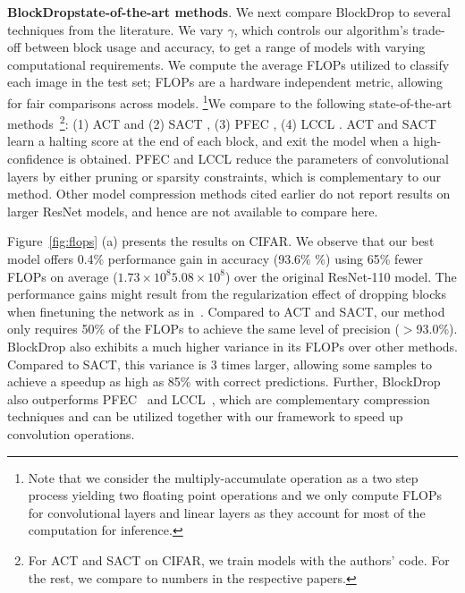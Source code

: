 \documentclass[10pt,twocolumn,letterpaper]{article}
\newcommand{\system}{BlockDrop\xspace}
\begin{document}
\vspace{0.05in}\noindent\textbf{\system \vs state-of-the-art methods}. We next compare \system to several techniques from the literature. %
We vary $\gamma$, which controls our algorithm's trade-off between block usage and accuracy, to get a range of models with varying computational requirements. %
We compute the average FLOPs utilized to classify each image in the test set; FLOPs are a hardware independent metric, allowing for fair comparisons across models. 
\footnote{Note that we consider the multiply-accumulate operation as a two step process yielding two floating point operations and we only compute FLOPs for convolutional layers and linear layers as they account for most of the computation for inference.}We compare to the following state-of-the-art methods~\footnote{For ACT and SACT on CIFAR, we train models with the authors' code. For the rest, we compare to numbers in the respective papers.}: (1) ACT and (2) SACT \cite{figurnov2017spatially}, (3) PFEC \cite{li2016pruning}, (4) LCCL \cite{dong2017more}.  ACT and SACT learn a halting score at the end of each block, and exit the model when a high-confidence is obtained.
PFEC and LCCL reduce the parameters of convolutional layers by either pruning or sparsity constraints, which is complementary to our method. Other model compression methods cited earlier do not report results on larger ResNet models, and hence are not available to compare here.

Figure~\ref{fig:flops} (a) presents the results on CIFAR. We observe that our best model offers 0.4\% performance gain in accuracy (93.6\% \%) using 65\% fewer FLOPs on average ($1.73\times10^{8}$\vs$5.08\times10^{8}$) over the original ResNet-110 model. The performance gains might result from the regularization effect of dropping blocks when finetuning the network as in~\cite{huang2016deep}.  Compared to ACT and SACT, our method only requires 50\% of the FLOPs to achieve the same level of  precision ($>$93.0\%). \system also exhibits a much higher variance in its FLOPs over other methods. Compared to SACT, this variance is 3 times larger, allowing some samples to achieve a speedup as high as 85\% with correct predictions. Further, \system also outperforms PFEC~\cite{li2016pruning} and LCCL~\cite{dong2017more}, which are complementary compression techniques and can be utilized together with our framework to speed up convolution operations. 
\end{document}
